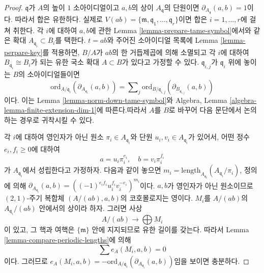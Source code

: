 \begin{proof}
$\mathfrak q$가 $A$의 높이 $1$ 소아이디얼이고 $a, b$의 상이
$A_\mathfrak q$의 단원이면
$\partial_{A_\mathfrak q}(a, b) = 1$이다. 따라서 합은 유한하다.
실제로
$V(ab) = \{\mathfrak m, \mathfrak q_1, \ldots, \mathfrak q_r\}$이면
합은 $i = 1, \ldots, r$에 걸쳐 취한다. 각 $i$에 대하여 $a, b$에
관한 Lemma \ref{lemma-prepare-tame-symbol}에서와 같은 확대
$A_{\mathfrak q_i} \subset B_i$를 택한다. $t = ab$와 주어진
소아이디얼 목록에 Lemma \ref{lemma-perpare-key}를 적용하면,
$B/A$가 $ab$의 한 거듭제곱에 의해 소멸되고 각 $i$에 대하여
$B_{\mathfrak q_i} \cong B_i$가 되는 유한 국소 확대 $A \subset B$가
있다고 가정할 수 있다. $\mathfrak q_{i, j}$가 $\mathfrak q_i$ 위에
놓이는 $B$의 소아이디얼들이면
$$
\text{ord}_{A/\mathfrak q_i}(\partial_{A_{\mathfrak q_i}}(a, b))
=
\sum\nolimits_j
\text{ord}_{B/\mathfrak q_{i, j}}(\partial_{B_{\mathfrak q_{i, j}}}(a, b))
$$
이다. 이는 Lemma \ref{lemma-norm-down-tame-symbol}와 Algebra, Lemma
\ref{algebra-lemma-finite-extension-dim-1}에 따른다.따라서 $A$를 $B$로 바꾸어 다음 문단에서 논의하는 경우로
귀착시킬 수 있다.

\medskip\noindent
각 $i$에 대하여 영인자가 아닌 원소
$\pi_i \in A_{\mathfrak q_i}$와 단원 $u_i, v_i \in A_{\mathfrak q_i}$가
있어서, 어떤 정수 $e_i, f_i \geq 0$에 대하여
$$
a = u_i \pi_i^{e_i},\quad b = v_i \pi_i^{f_i}
$$
가 $A_{\mathfrak q_i}$에서 성립한다고 가정하자. 다음과 같이 놓으면
$m_i = \text{length}_{A_{\mathfrak q_i}}(A_{\mathfrak q_i}/\pi_i)$,
정의에 의해
$\partial_{A_{\mathfrak q_i}}(a, b) =
((-1)^{e_if_i}u_i^{f_i}v_i^{-e_i})^{m_i}$이다.
$a, b$가 영인자가 아닌 원소이므로 $(2, 1)$-주기 복합체
$(A/(ab), a, b)$의 코호몰로지는 영이다. $M_i$를 $A/(ab)$의
$A_{\mathfrak q_i}/(ab)$ 안에서의 상이라 하자. 그러면 사상
$$
A/(ab) \longrightarrow \bigoplus M_i
$$
이 있고, 그 핵과 여핵은 $\{\mathfrak m\}$ 안에 지지되므로 유한
길이를 갖는다. 따라서 Lemma \ref{lemma-compare-periodic-lengths}에 의해
$$
\sum e_A(M_i, a, b) = 0
$$
이다. 그러므로
$e_A(M_i, a, b) =
- \text{ord}_{A/\mathfrak q_i}(\partial_{A_{\mathfrak q_i}}(a, b))$임을
보이면 충분하다.


\end{proof}

